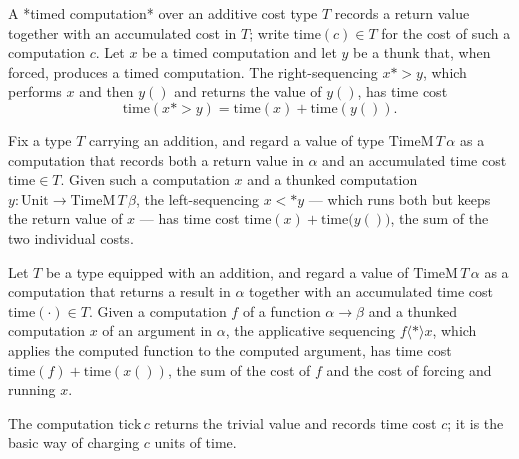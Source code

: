 \begin{theorem}
\label{TimeM.time_seqRight}
\leanok
{}
A *timed computation* over an additive cost type $T$ records a return value together
with an accumulated cost in $T$; write $\mathrm{time}(c) \in T$ for the cost of such a
computation $c$. Let $x$ be a timed computation and let $y$ be a thunk that, when
forced, produces a timed computation. The right-sequencing $x \mathbin{*>} y$, which
performs $x$ and then $y()$ and returns the value of $y()$, has time cost
\[\mathrm{time}(x \mathbin{*>} y) = \mathrm{time}(x) + \mathrm{time}(y()).\]
\end{theorem}

\begin{theorem}
\label{TimeM.time_seqLeft}
\leanok
{}
Fix a type $T$ carrying an addition, and regard a value of type
$\mathrm{TimeM}\,T\,\alpha$ as a computation that records both a return value in
$\alpha$ and an accumulated time cost $\mathrm{time}\in T$. Given such a computation $x$
and a thunked computation $y\colon \mathrm{Unit}\to \mathrm{TimeM}\,T\,\beta$, the
left-sequencing $x \mathbin{<*} y$ — which runs both but keeps the return value of $x$ —
has time cost $\mathrm{time}(x) + \mathrm{time}\bigl(y()\bigr)$, the sum of the two
individual costs.
\end{theorem}

\begin{theorem}
\label{TimeM.time_seq}
\leanok
{}
Let $T$ be a type equipped with an addition, and regard a value of
$\mathrm{TimeM}\,T\,\alpha$ as a computation that returns a result in $\alpha$ together
with an accumulated time cost $\mathrm{time}(\cdot) \in T$. Given a computation $f$ of a
function $\alpha \to \beta$ and a thunked computation $x$ of an argument in $\alpha$,
the applicative sequencing $f \mathbin{\langle *\rangle} x$, which applies the computed
function to the computed argument, has time cost $\mathrm{time}(f) +
\mathrm{time}(x())$, the sum of the cost of $f$ and the cost of forcing and running $x$.
\end{theorem}

\begin{definition}[Tick]
\label{TimeM.tick}
\leanok
The computation $\mathrm{tick}\,c$ returns the trivial value and records time cost $c$; it is the
basic way of charging $c$ units of time.
\end{definition}

